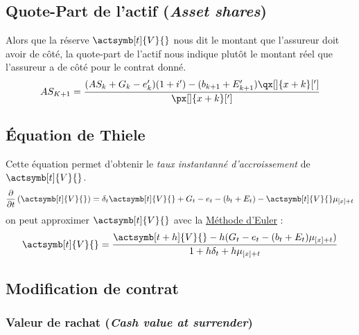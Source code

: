 \documentclass[10pt, french]{article}
\begin{document}
\begin{multicols*}{2}
\subsection*{Quote-Part de l'actif (\emph{Asset shares})}
Alors que la réserve $\actsymb[t]{V}{}$ nous dit le montant que l'assureur doit avoir de côté, la quote-part de l'actif nous indique plutôt le montant réel que l'assureur a de côté pour le contrat donné.
\[AS_{K+1} = \frac{(AS_{k} + G_k - e'_k)(1 + i') - (b_{k+1} + E'_{k+1}) \qx[]{x+k}[']     }{\px[]{x+k}[']}\]


\subsection*{Équation de Thiele}
Cette équation permet d'obtenir le \emph{taux instantanné d'accroissement} de $\actsymb[t]{V}{}$.
\[\derivee{t} \left( \actsymb[t]{V}{} \right) =\delta_t \actsymb[t]{V}{} + G_t - e_t - (b_t + E_t) - \actsymb[t]{V}{} \mu_{[x] + t}  \]
on peut approximer $\actsymb[t]{V}{}$ avec la \underline{Méthode d'Euler} : 
\[\actsymb[t]{V}{} = \frac{\actsymb[t+h]{V}{} - h(G_t - e_t - (b_t + E_t)\mu_{[x] + t})}{1 + h \delta_t + h \mu_{[x] + t}}   \]

\subsection*{Modification de contrat}
\subsubsection*{Valeur de rachat (\emph{Cash value at surrender})}









\end{multicols*}
\end{document}
